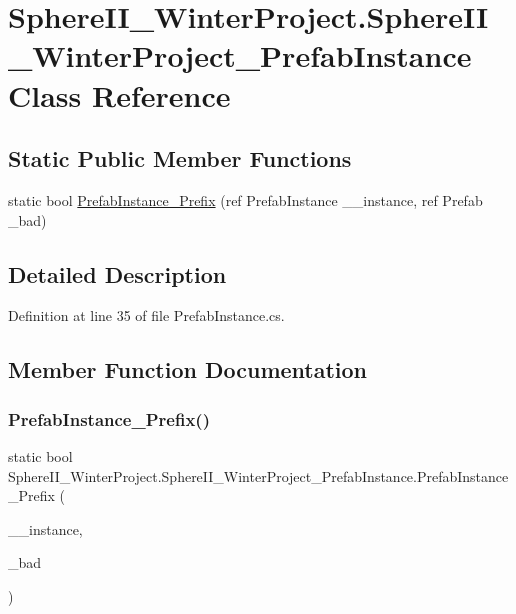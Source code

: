 \hypertarget{class_sphere_i_i___winter_project_1_1_sphere_i_i___winter_project___prefab_instance}{}\section{Sphere\+I\+I\+\_\+\+Winter\+Project.\+Sphere\+I\+I\+\_\+\+Winter\+Project\+\_\+\+Prefab\+Instance Class Reference}
\label{class_sphere_i_i___winter_project_1_1_sphere_i_i___winter_project___prefab_instance}
\subsection*{Static Public Member Functions}
\begin{DoxyCompactItemize}
\item 
static bool \mbox{\hyperlink{class_sphere_i_i___winter_project_1_1_sphere_i_i___winter_project___prefab_instance_a6efd2d62079db7b9416772b993227dde}{Prefab\+Instance\+\_\+\+Prefix}} (ref Prefab\+Instance \+\_\+\+\_\+instance, ref Prefab \+\_\+bad)
\end{DoxyCompactItemize}


\subsection{Detailed Description}


Definition at line 35 of file Prefab\+Instance.\+cs.



\subsection{Member Function Documentation}
\mbox{\label{class_sphere_i_i___winter_project_1_1_sphere_i_i___winter_project___prefab_instance_a6efd2d62079db7b9416772b993227dde}} 
\subsubsection{\texorpdfstring{PrefabInstance\_Prefix()}{PrefabInstance\_Prefix()}}
{\footnotesize\ttfamily static bool Sphere\+I\+I\+\_\+\+Winter\+Project.\+Sphere\+I\+I\+\_\+\+Winter\+Project\+\_\+\+Prefab\+Instance.\+Prefab\+Instance\+\_\+\+Prefix (\begin{DoxyParamCaption}\item[{ref Prefab\+Instance}]{\+\_\+\+\_\+instance,  }\item[{ref Prefab}]{\+\_\+bad }\end{DoxyParamCaption})\hspace{0.3cm}{\ttfamily [static]}}



